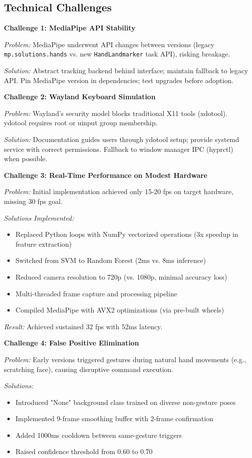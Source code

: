 \documentclass[11pt,a4paper]{article}
\begin{document}
\subsection{Technical Challenges}

\textbf{Challenge 1: MediaPipe API Stability}

\textit{Problem:} MediaPipe underwent API changes between versions (legacy \texttt{mp.solutions.hands} vs. new \texttt{HandLandmarker} task API), risking breakage.

\textit{Solution:} Abstract tracking backend behind interface; maintain fallback to legacy API. Pin MediaPipe version in dependencies; test upgrades before adoption.

\textbf{Challenge 2: Wayland Keyboard Simulation}

\textit{Problem:} Wayland's security model blocks traditional X11 tools (xdotool). ydotool requires root or uinput group membership.

\textit{Solution:} Documentation guides users through ydotool setup; provide systemd service with correct permissions. Fallback to window manager IPC (hyprctl) when possible.

\textbf{Challenge 3: Real-Time Performance on Modest Hardware}

\textit{Problem:} Initial implementation achieved only 15-20 fps on target hardware, missing 30 fps goal.

\textit{Solutions Implemented:}
\begin{itemize}
\item Replaced Python loops with NumPy vectorized operations (3x speedup in feature extraction)
\item Switched from SVM to Random Forest (2ms vs. 8ms inference)
\item Reduced camera resolution to 720p (vs. 1080p, minimal accuracy loss)
\item Multi-threaded frame capture and processing pipeline
\item Compiled MediaPipe with AVX2 optimizations (via pre-built wheels)
\end{itemize}

\textit{Result:} Achieved sustained 32 fps with 52ms latency.

\textbf{Challenge 4: False Positive Elimination}

\textit{Problem:} Early versions triggered gestures during natural hand movements (e.g., scratching face), causing disruptive command execution.

\textit{Solutions:}
\begin{itemize}
\item Introduced "None" background class trained on diverse non-gesture poses
\item Implemented 9-frame smoothing buffer with 2-frame confirmation
\item Added 1000ms cooldown between same-gesture triggers
\item Raised confidence threshold from 0.60 to 0.70
\end{itemize}
\end{document}
